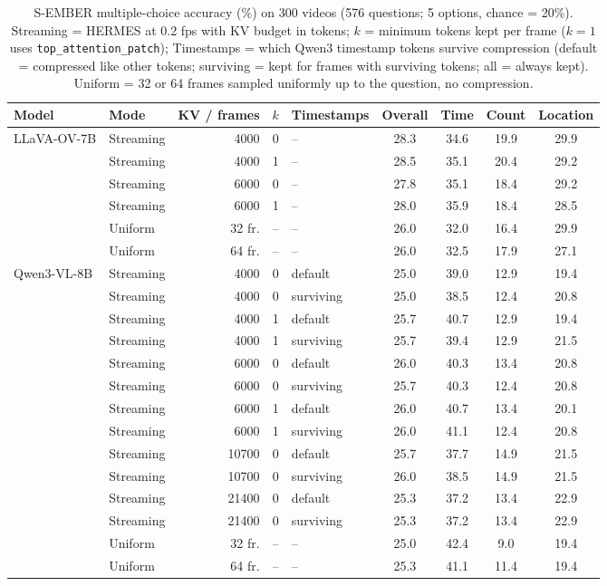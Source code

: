 
\begin{table}[t]
\centering
\small
\caption{S-EMBER multiple-choice accuracy (\%) on 300 videos (576 questions; 5 options, chance = 20\%). Streaming = HERMES at 0.2 fps with KV budget in tokens; $k$ = minimum tokens kept per frame ($k{=}1$ uses \texttt{top\_attention\_patch}); Timestamps = which Qwen3 timestamp tokens survive compression (default = compressed like other tokens; surviving = kept for frames with surviving tokens; all = always kept). Uniform = 32 or 64 frames sampled uniformly up to the question, no compression.}
\label{tab:sember-mcq-v300}
\begin{tabular}{llrclcccc}
\toprule
Model & Mode & KV / frames & $k$ & Timestamps & Overall & Time & Count & Location \\
\midrule
\multirow{6}{*}{LLaVA-OV-7B} & Streaming & 4000 & 0 & -- & 28.3 & 34.6 & 19.9 & 29.9 \\
 & Streaming & 4000 & 1 & -- & 28.5 & 35.1 & 20.4 & 29.2 \\
 & Streaming & 6000 & 0 & -- & 27.8 & 35.1 & 18.4 & 29.2 \\
 & Streaming & 6000 & 1 & -- & 28.0 & 35.9 & 18.4 & 28.5 \\
 & Uniform & 32 fr. & -- & -- & 26.0 & 32.0 & 16.4 & 29.9 \\
 & Uniform & 64 fr. & -- & -- & 26.0 & 32.5 & 17.9 & 27.1 \\
\midrule
\multirow{14}{*}{Qwen3-VL-8B} & Streaming & 4000 & 0 & default & 25.0 & 39.0 & 12.9 & 19.4 \\
 & Streaming & 4000 & 0 & surviving & 25.0 & 38.5 & 12.4 & 20.8 \\
 & Streaming & 4000 & 1 & default & 25.7 & 40.7 & 12.9 & 19.4 \\
 & Streaming & 4000 & 1 & surviving & 25.7 & 39.4 & 12.9 & 21.5 \\
 & Streaming & 6000 & 0 & default & 26.0 & 40.3 & 13.4 & 20.8 \\
 & Streaming & 6000 & 0 & surviving & 25.7 & 40.3 & 12.4 & 20.8 \\
 & Streaming & 6000 & 1 & default & 26.0 & 40.7 & 13.4 & 20.1 \\
 & Streaming & 6000 & 1 & surviving & 26.0 & 41.1 & 12.4 & 20.8 \\
 & Streaming & 10700 & 0 & default & 25.7 & 37.7 & 14.9 & 21.5 \\
 & Streaming & 10700 & 0 & surviving & 26.0 & 38.5 & 14.9 & 21.5 \\
 & Streaming & 21400 & 0 & default & 25.3 & 37.2 & 13.4 & 22.9 \\
 & Streaming & 21400 & 0 & surviving & 25.3 & 37.2 & 13.4 & 22.9 \\
 & Uniform & 32 fr. & -- & -- & 25.0 & 42.4 & 9.0 & 19.4 \\
 & Uniform & 64 fr. & -- & -- & 25.3 & 41.1 & 11.4 & 19.4 \\
\bottomrule
\end{tabular}
\end{table}

